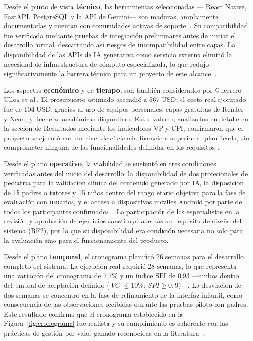 					Desde el punto de vista \textbf{técnico}, las herramientas seleccionadas --- React Native, FastAPI, PostgreSQL y la API de Gemini--- son maduras, ampliamente documentadas y cuentan con comunidades activas de soporte~\cite{Kleppmann2017,Fowler2002}. Su compatibilidad fue verificada mediante pruebas de integración preliminares antes de iniciar el desarrollo formal, descartando así riesgos de incompatibilidad entre capas. La disponibilidad de las APIs de IA generativa como servicio externo eliminó la necesidad de infraestructura de cómputo especializada, lo que redujo significativamente la barrera técnica para un proyecto de este alcance~\cite{Sengar2024}.
					
					Los aspectos \textbf{económico} y de \textbf{tiempo}, son también considerados por Guerrero-Ulloa et al.. El presupuesto estimado ascendió a 567 USD; el costo real ejecutado fue de 104 USD, gracias al uso de equipos personales, capas gratuitas de Render y Neon, y licencias académicas disponibles. Estos valores, analizados en detalle en la sección de Resultados mediante los indicadores VP y CPI, confirmaron que el proyecto se ejecutó con un nivel de eficiencia financiera superior al planificado, sin comprometer ninguna de las funcionalidades definidas en los requisitos~\cite{GuerreroUlloa2024}.
					
					Desde el plano \textbf{operativo}, la viabilidad se sustentó en tres condiciones verificadas antes del inicio del desarrollo: la disponibilidad de dos profesionales de pediatría para la validación clínica del contenido generado por IA, la disposición de 15 padres o tutores y 15 niños dentro del rango etario objetivo para la fase de evaluación con usuarios, y el acceso a dispositivos móviles Android por parte de todos los participantes confirmados~\cite{Creswell2018,Hourcade2015}. La participación de los especialistas en la revisión y aprobación de ejercicios constituyó además un requisito de diseño del sistema (RF2), por lo que su disponibilidad era condición necesaria no solo para la evaluación sino para el funcionamiento del producto.
					
					Desde el plano \textbf{temporal}, el cronograma planificó 26 semanas para el desarrollo completo del sistema. La ejecución real requirió 28 semanas, lo que representa una variación del cronograma de 7,7\% y un índice SPI de 0,93 ---ambos dentro del umbral de aceptación definido ($|VC| \leq 10\%$; $SPI \geq 0{,}9$)---. La desviación de dos semanas se concentró en la fase de refinamiento de la interfaz infantil, como consecuencia de las observaciones recibidas durante las pruebas piloto con padres. Este resultado confirma que el cronograma establecido en la Figura~\ref{fig:cronograma} fue realista y su cumplimiento es coherente con las prácticas de gestión por valor ganado reconocidas en la literatura~\cite{GuerreroUlloa2024}.
				
